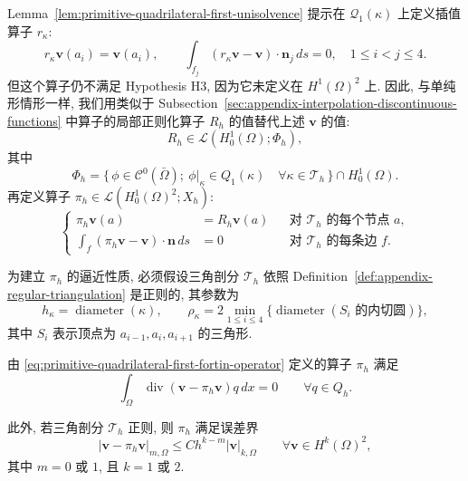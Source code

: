 Lemma~\ref{lem:primitive-quadrilateral-first-unisolvence} 提示在
$\mathcal Q_1(\kappa)$ 上定义插值算子 $r_\kappa$:
\[
r_\kappa\mathbf v(a_i)=\mathbf v(a_i),
\qquad
\int_{f_j}(r_\kappa\mathbf v-\mathbf v)\cdot\mathbf n_j\,ds=0,
\quad1\leq i<j\leq4.
\]
但这个算子仍不满足 Hypothesis H3, 因为它未定义在 $H^1(\Omega)^2$ 上.
因此, 与单纯形情形一样, 我们用类似于
Subsection~\ref{sec:appendix-interpolation-discontinuous-functions} 中算子的局部正则化算子
$R_h$ 的值替代上述 $\mathbf v$ 的值:
\[
R_h\in\mathcal L(H_0^1(\Omega);\Phi_h),
\]
其中
\[
\Phi_h=\{\,\phi\in\mathcal C^0(\bar\Omega);
\ \phi|_\kappa\in Q_1(\kappa)\quad\forall\kappa\in\mathcal T_h\,\}
\cap H_0^1(\Omega).
\]
再定义算子 $\pi_h\in\mathcal L(H_0^1(\Omega)^2;X_h)$:
\begin{equation}\label{eq:primitive-quadrilateral-first-fortin-operator}
\left\{
\begin{aligned}
\pi_h\mathbf v(a)&=R_h\mathbf v(a)
&&\text{对 $\mathcal T_h$ 的每个节点 $a$},\\
\int_f(\pi_h\mathbf v-\mathbf v)\cdot\mathbf n\,ds&=0
&&\text{对 $\mathcal T_h$ 的每条边 $f$}.
\end{aligned}
\right.
\end{equation}

为建立 $\pi_h$ 的逼近性质, 必须假设三角剖分 $\mathcal T_h$ 依照
Definition~\ref{def:appendix-regular-triangulation} 是正则的, 其参数为
\[
h_\kappa=\operatorname{diameter}(\kappa),
\qquad
\rho_\kappa=2\min_{1\leq i\leq4}
\{\operatorname{diameter}(S_i\text{ 的内切圆})\},
\]
其中 $S_i$ 表示顶点为 $a_{i-1},a_i,a_{i+1}$ 的三角形.

\setcounter{statement}{1}
\renewcommand{\theHstatement}{lemma.\thesection.\arabic{statement}}
\begin{Lemma}\label{lem:primitive-quadrilateral-first-fortin-estimates}
由 \eqref{eq:primitive-quadrilateral-first-fortin-operator} 定义的算子 $\pi_h$ 满足
\[
\int_\Omega\operatorname{div}(\mathbf v-\pi_h\mathbf v)q\,dx=0
\qquad\forall q\in Q_h.
\]

此外, 若三角剖分 $\mathcal T_h$ 正则, 则 $\pi_h$ 满足误差界
\begin{equation}\label{eq:primitive-quadrilateral-first-interpolation-error}
|\mathbf v-\pi_h\mathbf v|_{m,\Omega}
\leq Ch^{k-m}|\mathbf v|_{k,\Omega}
\qquad\forall\mathbf v\in H^k(\Omega)^2,
\end{equation}
其中 $m=0$ 或 $1$, 且 $k=1$ 或 $2$.
\end{Lemma}

